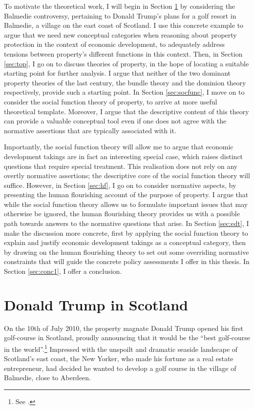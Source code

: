 To motivate the theoretical work, I will begin in Section \ref{sec:dts} by considering the Balmedie controversy, pertaining to Donald Trump's plans for a golf resort in Balmedie, a village on the east coast of Scotland. I use this concrete example to argue that we need new conceptual categories when reasoning about property protection in the context of economic development, to adequately address tensions between property's different functions in this context. Then, in Section \ref{sec:top}, I go on to discuss theories of property, in the hope of locating a suitable starting point for further analysis. I argue that neither of the two dominant property theories of the last century, the bundle theory and the dominion theory respectively, provide such a starting point. In Section \ref{sec:socfunc}, I move on to consider the social function theory of property, to arrive at more useful theoretical template. Moreover, I argue that the descriptive content of this theory can provide a valuable conceptual tool even if one does not agree with the normative assertions that are typically associated with it. 

Importantly, the social function theory will allow me to argue that economic development takings are in fact an interesting special case, which raises distinct questions that require special treatment. This realisation does not rely on any overtly normative assertions; the descriptive core of the social function theory will suffice. However, in Section \ref{sec:hf}, I go on to consider normative aspects, by presenting the human flourishing account of the purpose of property. I argue that while the social function theory allows us to formulate important issues that may otherwise be ignored, the human flourishing theory provides us with a possible path towards answers to the normative questions that arise. In Section \ref{sec:edt}, I make the discussion more concrete, first by applying the social function theory to explain and justify economic development takings as a conceptual category, then by drawing on the human flourishing theory to set out some overriding normative constraints that will guide the concrete policy assessments I offer in this thesis. In Section \ref{sec:conc1}, I offer a conclusion.

\section{Donald Trump in Scotland}\label{sec:dts}

On the 10th of July 2010, the property magnate Donald Trump opened his first golf-course in Scotland, proudly announcing that it would be the ``best golf-course in the world''.\footnote{See \cite{passow12}.} Impressed with the unspoilt and dramatic seaside landscape of Scotland's east coast, the New Yorker, who made his fortune as a real estate entrepreneur, had decided he wanted to develop a golf course in the village of Balmedie, close to Aberdeen.


